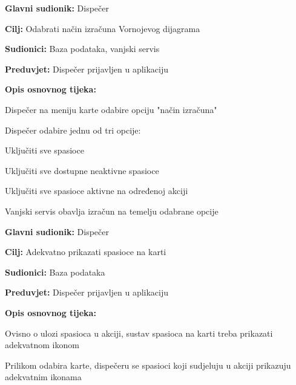 					\noindent {}
					\begin{packed_item}
	
						\item \textbf{Glavni sudionik: }\text Dispečer
						\item  \textbf{Cilj:} \text Odabrati način izračuna Vornojevog dijagrama
						\item  \textbf{Sudionici:} \text Baza podataka, vanjski servis
						\item  \textbf{Preduvjet:} \text Dispečer prijavljen u aplikaciju
						\item  \textbf{Opis osnovnog tijeka:}
						
						\item[] \begin{packed_enum}
	
							\item \text Dispečer na meniju karte odabire opciju "način izračuna"
							\item \text Dispečer odabire jednu od tri opcije:
								\begin{packed_enum}
									\item \text Uključiti sve spasioce
									\item \text Uključiti sve dostupne neaktivne spasioce
									\item \text Uključiti sve spasioce aktivne na određenoj akciji
								\end{packed_enum}
							\item \text Vanjski servis obavlja izračun na temelju odabrane opcije
						\end{packed_enum}
						
					\end{packed_item}	

					\noindent \underbar{\textbf{UC15 - \text Prikaz spasilaca}}
					\begin{packed_item}
	
						\item \textbf{Glavni sudionik: }\text Dispečer
						\item  \textbf{Cilj:} \text Adekvatno prikazati spasioce na karti
						\item  \textbf{Sudionici:} \text Baza podataka
						\item  \textbf{Preduvjet:} \text Dispečer prijavljen u aplikaciju
						\item  \textbf{Opis osnovnog tijeka:}
						
						\item[] \begin{packed_enum}
	
							\item \text Ovisno o ulozi spasioca u akciji, sustav spasioca na karti treba prikazati adekvatnom ikonom
							\item \text Prilikom odabira karte, dispečeru se spasioci koji sudjeluju u akciji prikazuju adekvatnim ikonama
						
						\end{packed_enum}
						
					\end{packed_item}	
				
